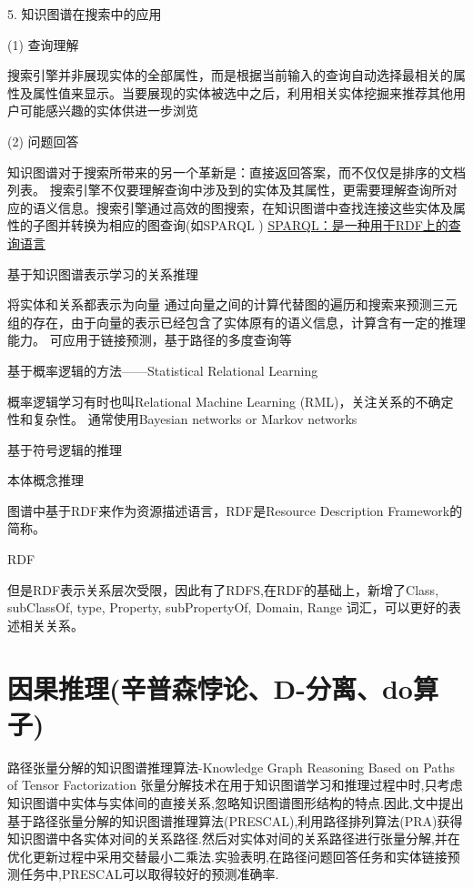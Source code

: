5. 知识图谱在搜索中的应用

(1) 查询理解

搜索引擎并非展现实体的全部属性，而是根据当前输入的查询自动选择最相关的属性及属性值来显示。当要展现的实体被选中之后，利用相关实体挖掘来推荐其他用户可能感兴趣的实体供进一步浏览

(2)  问题回答

知识图谱对于搜索所带来的另一个革新是：直接返回答案，而不仅仅是排序的文档列表。
搜索引擎不仅要理解查询中涉及到的实体及其属性，更需要理解查询所对应的语义信息。搜索引擎通过高效的图搜索，在知识图谱中查找连接这些实体及属性的子图并转换为相应的图查询(如SPARQL )
\href{https://www.w3.org/TR/rdf-sparql-query/}{SPARQL：是一种用于RDF上的查询语言}

基于知识图谱表示学习的关系推理

    将实体和关系都表示为向量
    通过向量之间的计算代替图的遍历和搜索来预测三元组的存在，由于向量的表示已经包含了实体原有的语义信息，计算含有⼀定的推理能⼒。
    可应⽤于链接预测，基于路径的多度查询等

基于概率逻辑的⽅法——Statistical Relational Learning

概率逻辑学习有时也叫Relational Machine Learning (RML)，关注关系的不确定性和复杂性。
通常使用Bayesian networks or Markov networks

基于符号逻辑的推理

本体概念推理

图谱中基于RDF来作为资源描述语言，RDF是Resource Description Framework的简称。

RDF

但是RDF表示关系层次受限，因此有了RDFS,在RDF的基础上，新增了Class, subClassOf, type, Property, subPropertyOf, Domain, Range 词汇，可以更好的表述相关关系。
\section{因果推理(辛普森悖论、D-分离、do算子)}

路径张量分解的知识图谱推理算法-Knowledge Graph Reasoning Based on Paths of Tensor Factorization
张量分解技术在用于知识图谱学习和推理过程中时,只考虑知识图谱中实体与实体间的直接关系,忽略知识图谱图形结构的特点.因此,文中提出基于路径张量分解的知识图谱推理算法(PRESCAL),利用路径排列算法(PRA)获得知识图谱中各实体对间的关系路径.然后对实体对间的关系路径进行张量分解,并在优化更新过程中采用交替最小二乘法.实验表明,在路径问题回答任务和实体链接预测任务中,PRESCAL可以取得较好的预测准确率.
